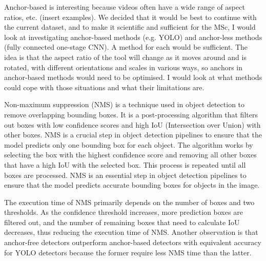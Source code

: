 Anchor-based is interesting because videos often have a wide range of aspect ratios, etc. (insert examples). We decided that it would be best to continue with the current dataset, and to make it scientific and sufficient for the MSc, I would look at investigating anchor-based methods (e.g. YOLO) and anchor-less methods (fully connected one-stage CNN). A method for each would be sufficient. The idea is that the aspect ratio of the tool will change as it moves around and is rotated, with different orientations and scales in various ways, so anchors in anchor-based methods would need to be optimised. I would look at what methods could cope with those situations and what their limitations are.

Non-maximum suppression (NMS) is a technique used in object detection to remove overlapping bounding boxes. It is a post-processing algorithm that filters out boxes with low confidence scores and high IoU (Intersection over Union) with other boxes. NMS is a crucial step in object detection pipelines to ensure that the model predicts only one bounding box for each object. The algorithm works by selecting the box with the highest confidence score and removing all other boxes that have a high IoU with the selected box. This process is repeated until all boxes are processed. NMS is an essential step in object detection pipelines to ensure that the model predicts accurate bounding boxes for objects in the image. 

The execution time of NMS primarily depends on the number of boxes and two thresholds. As the confidence threshold increases, more prediction boxes are filtered out, and the number of remaining boxes that need to calculate IoU decreases, thus reducing the execution time of NMS. Another observation is that anchor-free detectors outperform anchor-based detectors with equivalent accuracy for YOLO detectors because the former require less NMS time than the latter.

